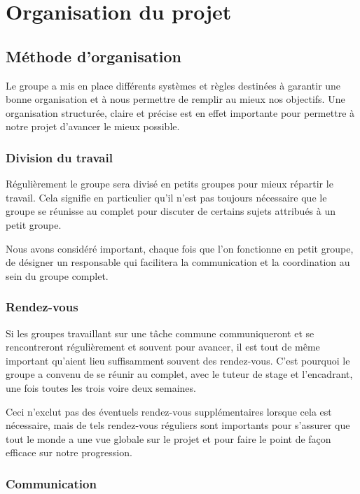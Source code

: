 \documentclass[a4paper, 12pt,twoside]{article}
\begin{document}
\section{Organisation du projet}

	\subsection{Méthode d'organisation}
	
	Le groupe a mis en place différents systèmes et règles destinées à garantir une bonne organisation et à nous permettre de remplir au mieux nos objectifs. Une organisation structurée, claire et précise est en effet importante pour permettre à notre projet d'avancer le mieux possible.
		
		\subsubsection{Division du travail}
		
		Régulièrement le groupe sera divisé en petits groupes pour mieux répartir le travail. Cela signifie en particulier qu'il n'est pas toujours nécessaire que le groupe se réunisse au complet pour discuter de certains sujets attribués à un petit groupe.
		
		Nous avons considéré important, chaque fois que l'on fonctionne en petit groupe, de désigner un responsable qui facilitera la communication et la coordination au sein du groupe complet.
		
		\subsubsection{Rendez-vous}
		
		Si les groupes travaillant sur une tâche commune communiqueront et se rencontreront régulièrement et souvent pour avancer, il est tout de même important qu'aient lieu suffisamment souvent des rendez-vous. C'est pourquoi le groupe a convenu de se réunir au complet, avec le tuteur de stage et l'encadrant, une fois toutes les trois voire deux semaines.
		
		Ceci n'exclut pas des éventuels rendez-vous supplémentaires lorsque cela est nécessaire, mais de tels rendez-vous réguliers sont importants pour s'assurer que tout le monde a une vue globale sur le projet et pour faire le point de façon efficace sur notre progression.
		
		\subsubsection{Communication}
		
\end{document}

